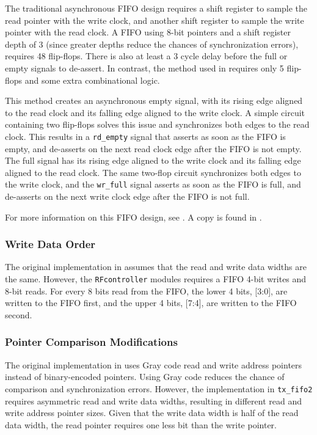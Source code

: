 The traditional asynchronous FIFO design requires a shift register to sample the read pointer with the write clock, and another shift register to sample the write pointer with the read clock. A FIFO using 8-bit pointers and a shift register depth of 3 (since greater depths reduce the chances of synchronization errors), requires 48 flip-flops. There is also at least a 3 cycle delay before the full or empty signals to de-assert. In contrast, the method used in \cite{async-fifo} requires only 5 flip-flops and some extra combinational logic.

This method creates an asynchronous empty signal, with its rising edge aligned to the read clock and its falling edge aligned to the write clock. A simple circuit containing two flip-flops solves this issue and synchronizes both edges to the read clock. This results in a \texttt{rd\_empty} signal that asserts as soon as the FIFO is empty, and de-asserts on the next read clock edge after the FIFO is not empty. The full signal has its rising edge aligned to the write clock and its falling edge aligned to the read clock. The same two-flop circuit synchronizes both edges to the write clock, and the \texttt{wr\_full} signal asserts as soon as the FIFO is full, and de-asserts on the next write clock edge after the FIFO is not full.

For more information on this FIFO design, see \cite{async-fifo}. A copy is found in .

\subsubsection{Write Data Order}
The original implementation in \cite{async-fifo} assumes that the read and write data widths are the same. However, the \texttt{RFcontroller} modules requires a FIFO 4-bit writes and 8-bit reads. For every 8 bits read from the FIFO, the lower 4 bits, [3:0], are written to the FIFO first, and the upper 4 bits, [7:4], are written to the FIFO second.

\subsubsection{Pointer Comparison Modifications}
The original implementation in \cite{async-fifo} uses Gray code read and write address pointers instead of binary-encoded pointers. Using Gray code reduces the chance of comparison and synchronization errors. However, the implementation in \texttt{tx\_fifo2} requires asymmetric read and write data widths, resulting in different read and write address pointer sizes. Given that the write data width is half of the read data width, the read pointer requires one less bit than the write pointer.


